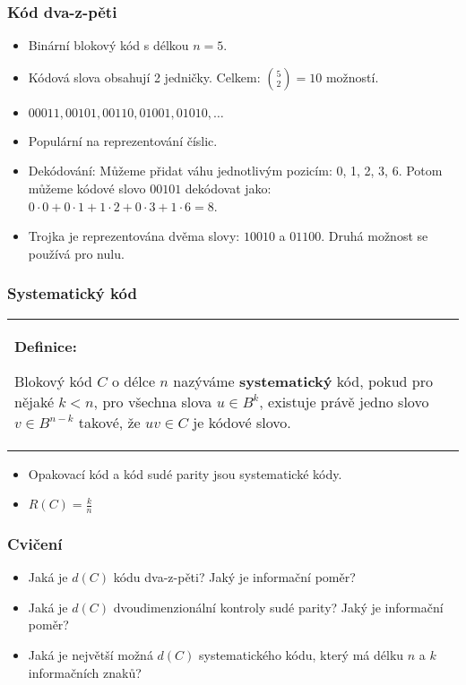 \documentclass{beamer}
\newenvironment{definice}
{
    \begin{center}
    \begin{tabular}{p{9cm}}
    \textbf{Definice:}
}
{
    \end{tabular}
    \end{center}
}
\newenvironment{itemizex}%
  {\large \begin{itemize}%
    \setlength{\itemsep}{8pt}%
    \setlength{\parskip}{8pt}}%
  {\end{itemize}}
\newenvironment{itemize4}%
  {\large \begin{itemize}%
    \setlength{\itemsep}{4pt}%
    \setlength{\parskip}{4pt}}%
  {\end{itemize}}
\begin{document}
\begin{frame}[t,fragile]\frametitle{Kód dva-z-pěti} 
    \begin{itemize4}
        \item Binární blokový kód s délkou $n=5$.
        \item Kódová slova obsahují 2 jedničky. Celkem: ${5\choose2}=10$ možností.
        \item $00011, 00101, 00110,01001,01010,\dots$
        \item Populární na reprezentování číslic. 
        \item Dekódování: Můžeme přidat váhu jednotlivým pozicím: 0, 1, 2, 3, 6. Potom můžeme kódové slovo $00101$ dekódovat jako: $0\cdot0+0\cdot1+1\cdot2+0\cdot3+1\cdot6=8$.
        \item Trojka je reprezentována dvěma slovy: $10010$ a $01100$. Druhá možnost se používá pro nulu. 
    \end{itemize4}
\end{frame}


\begin{frame}[t,fragile]\frametitle{Systematický kód} 
\begin{definice}
Blokový kód $C$ o délce $n$ nazýváme \textbf{systematický} kód, pokud pro nějaké $k<n$, pro všechna slova $u\in B^k$, existuje právě jedno slovo $v\in B^{n-k}$ takové, že $uv\in C$ je kódové slovo.
\end{definice}

\begin{itemizex}
    \item Opakovací kód a kód sudé parity jsou systematické kódy.
    \item $R(C)=\frac{k}{n}$
\end{itemizex}
\end{frame}

\begin{frame}[t,fragile]\frametitle{Cvičení} 
    \begin{itemizex}
        \item Jaká je $d(C)$ kódu dva-z-pěti? Jaký je informační poměr?
        \item Jaká je $d(C)$ dvoudimenzionální kontroly sudé parity? Jaký je informační poměr?
        \item Jaká je největší možná $d(C)$ systematického kódu, který má délku $n$ a $k$ informačních znaků?
    \end{itemizex}
\end{frame}
\end{document}
